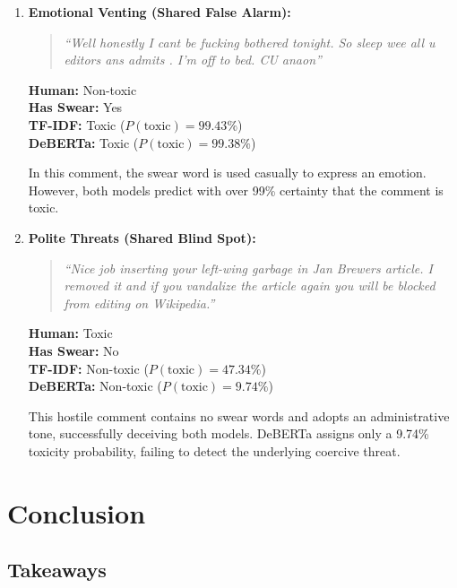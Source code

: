 \documentclass[11pt]{article}
\begin{document}
\begin{enumerate}\setlength{\itemsep}{1pt}\setlength{\parskip}{0pt}
  \item \textbf{Emotional Venting (Shared False Alarm):}
    \begin{quote}
      \small
      \textit{``Well honestly I cant be fucking bothered tonight. So
      sleep wee all u editors ans admits . I'm off to bed. CU anaon''}
    \end{quote}
    \small
    \textbf{Human:} Non-toxic \\
    \textbf{Has Swear:} Yes \\
    \textbf{TF-IDF:} Toxic ($P(\text{toxic}) = 99.43\%$) \\
    \textbf{DeBERTa:} Toxic ($P(\text{toxic}) = 99.38\%$)
    \par
    \normalsize
    In this comment, the swear word is used casually to express an
    emotion. However, both models predict with over 99\% certainty
    that the comment is toxic.

  \item \textbf{Polite Threats (Shared Blind Spot):}
    \begin{quote}
      \small
      \textit{``Nice job inserting your left-wing garbage in Jan
        Brewers article. I removed it and if you vandalize the article
      again you will be blocked from editing on Wikipedia.''}
    \end{quote}
    \small
    \textbf{Human:} Toxic \\
    \textbf{Has Swear:} No \\
    \textbf{TF-IDF:} Non-toxic ($P(\text{toxic}) = 47.34\%$) \\
    \textbf{DeBERTa:} Non-toxic ($P(\text{toxic}) = 9.74\%$)
    \par
    \normalsize
    This hostile comment contains no swear words and adopts
    an administrative tone, successfully deceiving both models. DeBERTa
    assigns only a 9.74\% toxicity probability, failing to detect
    the underlying coercive threat.
\end{enumerate}

\section{Conclusion}

\subsection{Takeaways}
\end{document}
